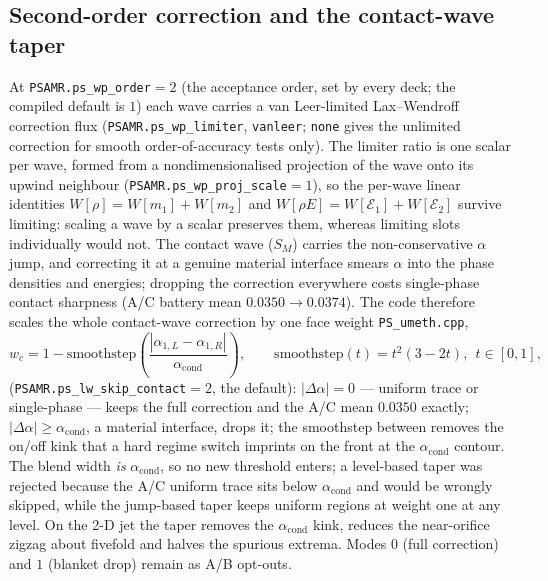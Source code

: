 \documentclass[11pt,a4paper]{article}
\newcommand{\code}[1]{\texttt{\small #1}}
\newcommand{\src}[1]{{\color{gray}\code{#1}}}
\begin{document}
\subsection{Second-order correction and the contact-wave taper}
\label{sec:limiter}

At \code{PSAMR.ps\_wp\_order}$=2$ (the acceptance order, set by every
deck; the compiled default is $1$) each wave carries a van Leer-limited
Lax--Wendroff correction flux (\code{PSAMR.ps\_wp\_limiter}, \code{vanleer};
\code{none} gives the unlimited correction for smooth order-of-accuracy
tests only).  The limiter ratio is one scalar per wave, formed from a
nondimensionalised projection of the wave onto its upwind neighbour
(\code{PSAMR.ps\_wp\_proj\_scale}$=1$), so the per-wave linear identities
$W[\rho]=W[m_1]+W[m_2]$ and $W[\rho E]=W[\mathcal{E}_1]+W[\mathcal{E}_2]$
survive limiting: scaling a wave by a scalar preserves them, whereas limiting
slots individually would not.  The contact wave ($S_M$) carries the
non-conservative $\alpha$ jump, and correcting it at a genuine material
interface smears $\alpha$ into the phase densities and energies; dropping the
correction everywhere costs single-phase contact sharpness (A/C battery mean
$0.0350\to0.0374$).  The code therefore scales the whole contact-wave
correction by one face weight \src{PS\_umeth.cpp},
\begin{equation}
  w_c = 1 - \mathrm{smoothstep}\!\left(
        \frac{|\alpha_{1,L}-\alpha_{1,R}|}{\alpha_{\mathrm{cond}}}\right),
  \qquad
  \mathrm{smoothstep}(t)=t^2(3-2t),\ \ t\in[0,1],
  \label{eq:wckeep}
\end{equation}
(\code{PSAMR.ps\_lw\_skip\_contact}$=2$, the default): $|\Delta\alpha|=0$ ---
uniform trace or single-phase --- keeps the full correction and the A/C mean
$0.0350$ exactly; $|\Delta\alpha|\ge\alpha_{\mathrm{cond}}$, a material
interface, drops it; the smoothstep between removes the on/off kink that a
hard regime switch imprints on the front at the $\alpha_{\mathrm{cond}}$
contour.  The blend width \emph{is} $\alpha_{\mathrm{cond}}$, so no new
threshold enters; a level-based taper was rejected because the A/C uniform
trace sits below $\alpha_{\mathrm{cond}}$ and would be wrongly skipped, while
the jump-based taper keeps uniform regions at weight one at any level.  On
the 2-D jet the taper removes the $\alpha_{\mathrm{cond}}$ kink, reduces the
near-orifice zigzag about fivefold and halves the spurious extrema.  Modes
$0$ (full correction) and $1$ (blanket drop) remain as A/B opt-outs.

\end{document}
